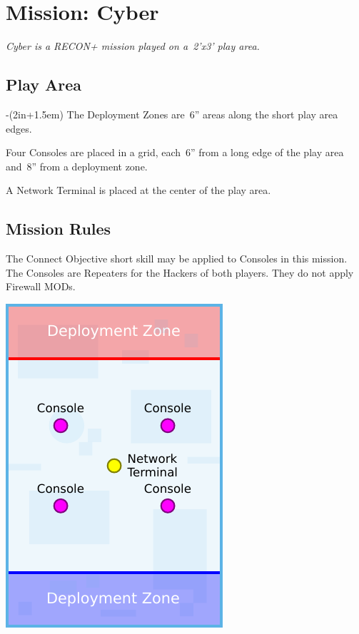\chapter{Mission: Cyber}

\emph{\emph{Cyber} is a RECON+ mission played on a~2'x3' play area.}


\section{Play Area}
\vspace{-2\parskip}
\noindent\begin{stdminipage}{\linewidth-(2in+1.5em)}
\vspace{0pt}   
\noindent
The Deployment Zones are~6'' areas along the short
play area edges.

Four Consoles are placed in a grid, each~6'' from a long edge of the
play area and~8'' from a deployment zone.

A Network Terminal is placed at the center of the play area.

\section{Mission Rules}

The Connect Objective short skill may be applied to Consoles in this
mission.  The Consoles are Repeaters for the Hackers of both players.
They do not apply Firewall MODs.

\end{stdminipage}
\hfill
\begin{minipage}[t]{2in}\centering
\vspace{4pt}   
\includegraphics{maps/map-cyber}
\end{minipage}

